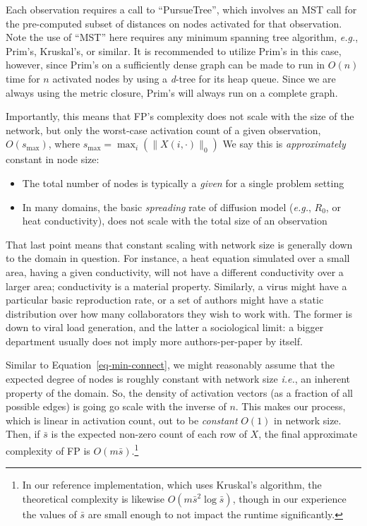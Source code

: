 \documentclass[%
	12pt,
		oneside,
		letterpaper
]{book}
\providecommand{\tightlist}{%
  \setlength{\itemsep}{0pt}\setlength{\parskip}{0pt}}\usepackage{longtable,booktabs,array}
\begin{document}
Each observation requires a call to ``PursueTree'', which involves an MST call for the pre-computed subset of distances on nodes activated for that observation.
Note the use of ``MST'' here requires any minimum spanning tree algorithm, \emph{e.g.}, Prim's, Kruskal's, or similar.
It is recommended to utilize Prim's in this case, however, since Prim's on a sufficiently dense graph can be made to run in \(O(n)\) time for \(n\) activated nodes by using a \emph{d}-tree for its heap queue.\autocite{Datastructuresnetwork_Tarjan1983}
Since we are always using the metric closure, Prim's will always run on a complete graph.

Importantly, this means that FP's complexity does not scale with the size of the network, but only the worst-case activation count of a given observation, \(O(s_{\text{max}})\), where \(s_{\text{max}}=\max_i{(\|X(i,\cdot)\|_0)}\)
We say this is \emph{approximately} constant in node size:

\begin{itemize}
\tightlist
\item
  The total number of nodes is typically a \emph{given} for a single problem setting
\item
  In many domains, the basic \emph{spreading} rate of diffusion model (\emph{e.g.}, \(R_0\), or heat conductivity), does not scale with the total size of an observation
\end{itemize}

That last point means that constant scaling with network size is generally down to the domain in question.
For instance, a heat equation simulated over a small area, having a given conductivity, will not have a different conductivity over a larger area; conductivity is a material property.
Similarly, a virus might have a particular basic reproduction rate, or a set of authors might have a static distribution over how many collaborators they wish to work with.
The former is down to viral load generation, and the latter a sociological limit: a bigger department usually does not imply more authors-per-paper by itself.

Similar to Equation~\ref{eq-min-connect}, we might reasonably assume that the expected degree of nodes is roughly constant with network size \emph{i.e.}, an inherent property of the domain.
So, the density of activation vectors (as a fraction of all possible edges) is going go scale with the inverse of \(n\).
This makes our process, which is linear in activation count, out to be \emph{constant} \(O(1)\) in network size.
Then, if \(\bar{s}\) is the expected non-zero count of each row of \(X\), the final approximate complexity of FP is \(O(m\bar{s})\).\footnote{
  In our reference implementation, which uses Kruskal's algorithm, the theoretical complexity is likewise \(O(m\bar{s}^2\log{\bar{s}})\), though in our experience the values of \(\bar{s}\) are small enough to not impact the runtime significantly.}
\end{document}
